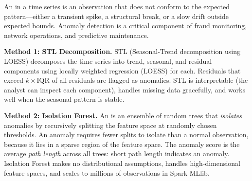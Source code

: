 An  in a time series is an observation that does not conform
to the expected pattern---either a transient spike, a structural break,
or a slow drift outside expected bounds. Anomaly detection is a critical
component of fraud monitoring, network operations, and predictive
maintenance.

\textbf{Method 1: STL Decomposition.} STL (Seasonal-Trend decomposition
using LOESS) decomposes the time series into trend, seasonal, and
residual components using locally weighted regression (LOESS) for each.
Residuals that exceed $k \times \text{IQR}$ of all residuals are flagged
as anomalies. STL is interpretable (the analyst can inspect each component),
handles missing data gracefully, and works well when the seasonal pattern
is stable.

\textbf{Method 2: Isolation Forest.} An  is an
ensemble of random trees that \emph{isolates} anomalies by recursively
splitting the feature space at randomly chosen thresholds. An anomaly
requires fewer splits to isolate than a normal observation, because it
lies in a sparse region of the feature space. The anomaly score is the
average \emph{path length} across all trees: short path length indicates
an anomaly. Isolation Forest makes no distributional assumptions, handles
high-dimensional feature spaces, and scales to millions of observations
in Spark MLlib.

